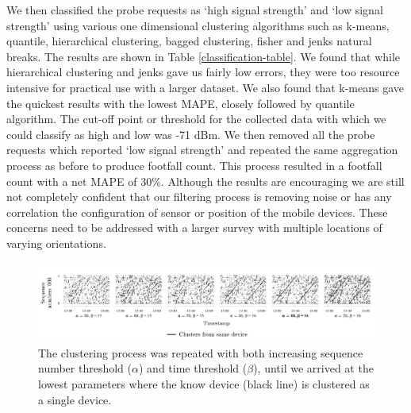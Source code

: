 We then classified the probe requests as `high signal strength' and `low signal
strength' using various one dimensional clustering algorithms such as k-means,
quantile, hierarchical clustering, bagged clustering, fisher and jenks natural
breaks. The results are shown in Table \ref{classification-table}. We found that
while hierarchical clustering and jenks gave us fairly low errors, they were too
resource intensive for practical use with a larger dataset. We also found that
k-means gave the quickest results with the lowest MAPE, closely followed by
quantile algorithm. The cut-off point or threshold for the collected data with
which we could classify as high and low was -71 dBm. We then removed all the
probe requests which reported `low signal strength' and repeated the same
aggregation process as before to produce footfall count. This process resulted
in a footfall count with a net MAPE of 30\%. Although the results are
encouraging we are still not completely confident that our filtering process is
removing noise or has any correlation the configuration of sensor or position of
the mobile devices. These concerns need to be addressed with a larger survey
with multiple locations of varying orientations.

\begin{figure}
\begin{center}
\vspace{10pt}
\includegraphics [width=\linewidth,trim=10 30 10 75,clip]
    {images/pilot_clustering_params.png}
\caption{The clustering process was repeated with both increasing sequence
    number threshold ($\alpha$) and time threshold ($\beta$), until we arrived
    at the lowest parameters where the know device (black line) is clustered as
    a single device.}
\label{pilot_clustering_params}
\end{center}
\end{figure}

